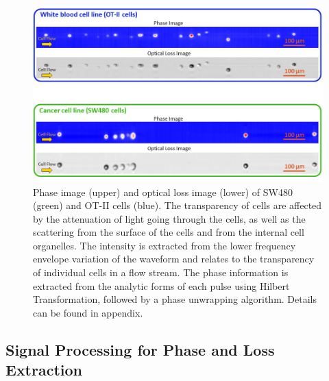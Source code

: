 \documentclass[aps,pra,preprint,superscriptaddress]{revtex4-1}
\begin{document}
\begin{figure}
\includegraphics[scale=0.5]{Figure2DImage.jpg}
\caption{\label{fig:2DImage} Phase image (upper) and optical loss image (lower) of SW480 (green) and OT-II cells (blue). The transparency of cells are affected by the attenuation of light going through the cells, as well as the scattering from the surface of the cells and from the internal cell organelles. The intensity is extracted from the lower frequency envelope variation of the waveform and relates to the transparency of individual cells in a flow stream. The phase information is extracted from the analytic forms of each pulse using Hilbert Transformation, followed by a phase unwrapping algorithm. Details can be found in appendix.}
\end{figure}

\subsection{Signal Processing for Phase and Loss Extraction}
\end{document}
